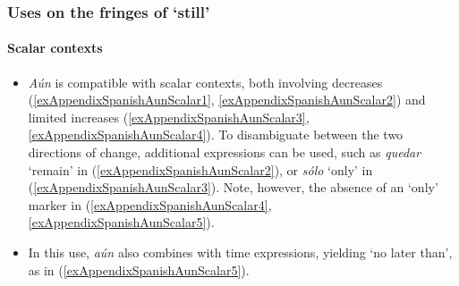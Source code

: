\subsubsection{Uses on the fringes of \lq{}still\rq{}}
\paragraph{Scalar contexts}
\label{appendixSpanishAunScalar}
\begin{itemize}
	\item \textit{Aún} is compatible with scalar contexts, both involving decreases (\ref{exAppendixSpanishAunScalar1}, \ref{exAppendixSpanishAunScalar2}) and limited increases (\ref{exAppendixSpanishAunScalar3}, \ref{exAppendixSpanishAunScalar4}). To disambiguate between the two directions of change, additional expressions can be used, such as \textit{quedar} \lq remain\rq{ }in (\ref{exAppendixSpanishAunScalar2}), or \textit{sólo} \lq only\rq{ }in (\ref{exAppendixSpanishAunScalar3}). Note, however, the absence of an \lq only\rq{ }marker in (\ref{exAppendixSpanishAunScalar4}, \ref{exAppendixSpanishAunScalar5}).
	\item In this use, \textit{aún} also combines with time expressions, yielding \lq no later than\rq{}, as in  (\ref{exAppendixSpanishAunScalar5}).
\end{itemize}
